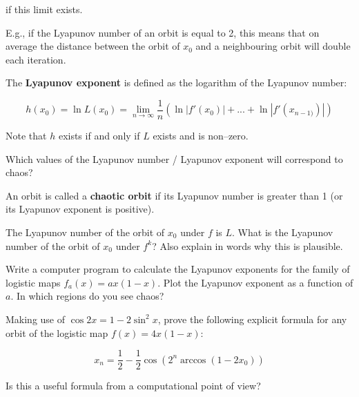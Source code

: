 if this limit exists.

E.g., if the Lyapunov number of an orbit is equal to 2, this means that on average the distance between the orbit of $x_0$ and a neighbouring orbit will double each iteration.

The \textbf{Lyapunov exponent} is defined as the logarithm of the Lyapunov number:

\begin{equation}
h(x_0) = \ln L(x_0) = \lim _{n \to \infty}\frac{1}{n}\left(\ln\left|f'(x_0)\right| + ... + \ln\left|f'(x_{n-1)})\right|\right)
\end{equation} 

Note that $h$ exists if and only if $L$ exists and is non--zero.

\begin{cue}
Which values of the Lyapunov number / Lyapunov exponent will correspond to chaos?  
\end{cue}

An orbit is called a \textbf{chaotic orbit} if its Lyapunov number is greater than 1 (or its Lyapunov exponent is positive). 

\pagebreak

\begin{exer}
The Lyapunov number of the orbit of $x_0$ under $f$ is $L$. What is the Lyapunov number of the orbit of $x_0$ under $f^k$? Also explain in words why this is plausible.
\end{exer}

\begin{exer}
Write a computer program to calculate the Lyapunov exponents for the family of logistic maps $f_a(x)=ax(1-x)$. Plot the Lyapunov exponent as a function of $a$. In which regions do you see chaos?
\end{exer}


\begin{exer}
Making use of $\cos 2x = 1- 2 \sin^2 x$, prove the following explicit formula for any orbit of the logistic map $f(x) = 4x(1-x)$:

$$x_n= \frac{1}{2} -\frac{1}{2} \cos(2^n\arccos(1-2x_0))$$

Is this a useful formula from a computational point of view?
\end{exer}


\pagebreak


